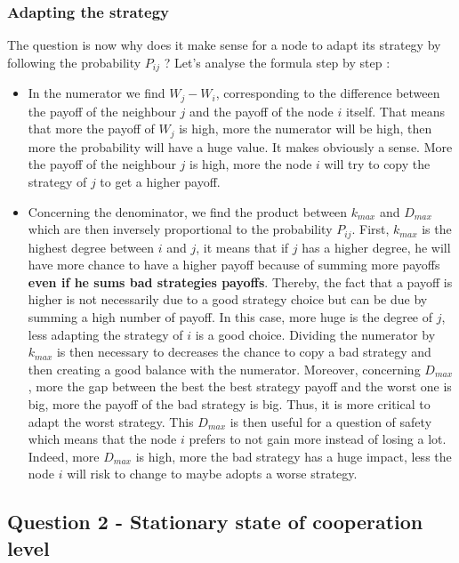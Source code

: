 \documentclass{article}
\begin{document}
\subsubsection{Adapting the strategy}
The question is now why does it make sense for a node to adapt its strategy by following the probability $P_{ij}$ ? Let's analyse the formula step by step : 

\begin{itemize}
\item In the numerator we find $W_{j} - W_{i}$, corresponding to the difference between the payoff of the neighbour $j$ and the payoff of the node $i$ itself. That means that more the payoff of $W_{j}$ is high, more the numerator will be high, then more the probability will have a huge value. It makes obviously a sense. More the payoff of the neighbour $j$ is high, more the node $i$ will try to copy the strategy of $j$ to get a higher payoff. 
\item Concerning the denominator, we find the product between $k_{max}$ and $D_{max}$ which are then inversely proportional to the probability $P_{ij}$. First, $k_{max}$ is the highest degree between $i$ and $j$, it means that if $j$ has a higher degree, he will have more chance to have a higher payoff because of summing more payoffs \textbf{even if he sums bad strategies payoffs}. Thereby, the fact that a payoff is higher is not necessarily due to a good strategy choice but can be due by summing a high number of payoff. In this case, more huge is the degree of $j$, less adapting the strategy of $i$ is a good choice. Dividing the numerator by $k_{max}$ is then necessary to decreases the chance to copy a bad strategy and then creating a good balance with the numerator.  
Moreover, concerning $D_{max}$, more the gap between the best the best strategy payoff and the worst one is big, more the payoff of the bad strategy is big. Thus, it is more critical to adapt the worst strategy. This $D_{max}$ is then useful for a question of safety which means that the node $i$ prefers to not gain more instead of losing a lot. Indeed, more $D_{max}$ is high, more the bad strategy has a huge impact, less the node $i$ will risk to change to maybe adopts a worse strategy.  
\end{itemize}

\subsection{Question 2 - Stationary state of cooperation level}
\end{document}
